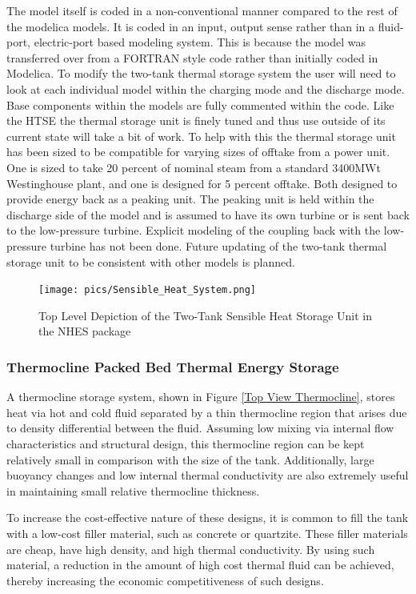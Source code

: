 The model itself is coded in a non-conventional manner compared to the rest of the modelica models. It is coded in an input, output sense rather than in a fluid-port, electric-port based modeling system. This is because the model was transferred over from a FORTRAN style code rather than initially coded in Modelica. To modify the two-tank thermal storage system the user will need to look at each individual model within the charging mode and the discharge mode. Base components within the models are fully commented within the code. Like the HTSE the thermal storage unit is finely tuned and thus use outside of its current state will take a bit of work. To help with this the thermal storage unit has been sized to be compatible for varying sizes of offtake from a power unit. One is sized to take 20 percent of nominal steam from a standard 3400MWt Westinghouse plant, and one is designed for 5 percent offtake. Both designed to provide energy back as a peaking unit. The peaking unit is held within the discharge side of the model and is assumed to have its own turbine or is sent back to the low-pressure turbine. Explicit modeling of the coupling back with the low-pressure turbine has not been done. Future updating of the two-tank thermal storage unit to be consistent with other models is planned.

 
\begin{figure}[hbtp]
\centering
\texttt{[image: pics/Sensible\_Heat\_System.png]}
\caption{Top Level Depiction of the Two-Tank Sensible Heat Storage Unit in the NHES package}
\label{Top View Two Tank Sensible Storage}
\end{figure}

\subsubsection{Thermocline Packed Bed Thermal Energy Storage}
A thermocline storage system, shown in Figure \ref{Top View Thermocline}, stores heat via hot and cold fluid separated by a thin thermocline region that arises due to density differential between the fluid. Assuming low mixing via internal flow characteristics and structural design, this thermocline region can be kept relatively small in comparison with the size of the tank. Additionally, large buoyancy changes and low internal thermal conductivity are also extremely useful in maintaining small relative thermocline thickness.

To increase the cost-effective nature of these designs, it is common to fill the tank with a low-cost filler material, such as concrete or quartzite. These filler materials are cheap, have high density, and high thermal conductivity. By using such material, a reduction in the amount of high cost thermal fluid can be achieved, thereby increasing the economic competitiveness of such designs.

